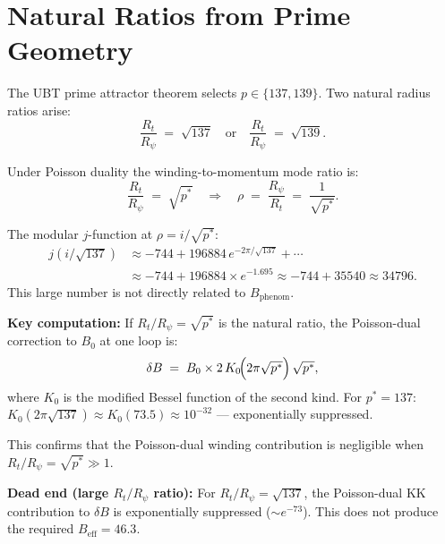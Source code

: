 \documentclass[12pt,a4paper]{article}
\theoremstyle{definition}
\theoremstyle{remark}
\begin{document}
\section{Natural Ratios from Prime Geometry}
\label{sec:natural_ratios}

The UBT prime attractor theorem selects $p \in \{137, 139\}$.  Two natural
radius ratios arise:
\begin{equation}
  \frac{R_t}{R_\psi} \;=\; \sqrt{137}
  \quad\text{or}\quad
  \frac{R_t}{R_\psi} \;=\; \sqrt{139}.
\end{equation}

Under Poisson duality the winding-to-momentum mode ratio is:
\begin{equation}
  \frac{R_t}{R_\psi} \;=\; \sqrt{p^*}
  \quad\Longrightarrow\quad
  \rho \;=\; \frac{R_\psi}{R_t} \;=\; \frac{1}{\sqrt{p^*}}.
\end{equation}

The modular $j$-function at $\rho = i/\sqrt{p^*}$:
\begin{align}
  j(i/\sqrt{137}) &\approx -744 + 196884\,e^{-2\pi/\sqrt{137}} + \cdots\\
                  &\approx -744 + 196884 \times e^{-1.695} \approx -744 + 35540 \approx 34796.
\end{align}
This large number is not directly related to $B_{\mathrm{phenom}}$.

\begin{insightbox}
\textbf{Key computation:}
If $R_t/R_\psi = \sqrt{p^*}$ is the natural ratio, the Poisson-dual
correction to $B_0$ at one loop is:
\begin{equation}
  \delta B \;=\; B_0 \times 2\,K_0\!\Bigl(2\pi\sqrt{p^*}\Bigr)\,\sqrt{p^*},
\end{equation}
where $K_0$ is the modified Bessel function of the second kind.
For $p^* = 137$:
$K_0(2\pi\sqrt{137}) \approx K_0(73.5) \approx 10^{-32}$ ---
exponentially suppressed.

This confirms that the Poisson-dual winding contribution is negligible
when $R_t/R_\psi = \sqrt{p^*} \gg 1$.
\end{insightbox}

\begin{deadendbox}
\textbf{Dead end (large $R_t/R_\psi$ ratio):}
For $R_t/R_\psi = \sqrt{137}$, the Poisson-dual KK contribution to
$\delta B$ is exponentially suppressed ($\sim e^{-73}$).
This does not produce the required $B_{\mathrm{eff}} = 46.3$.
\end{deadendbox}
\end{document}

